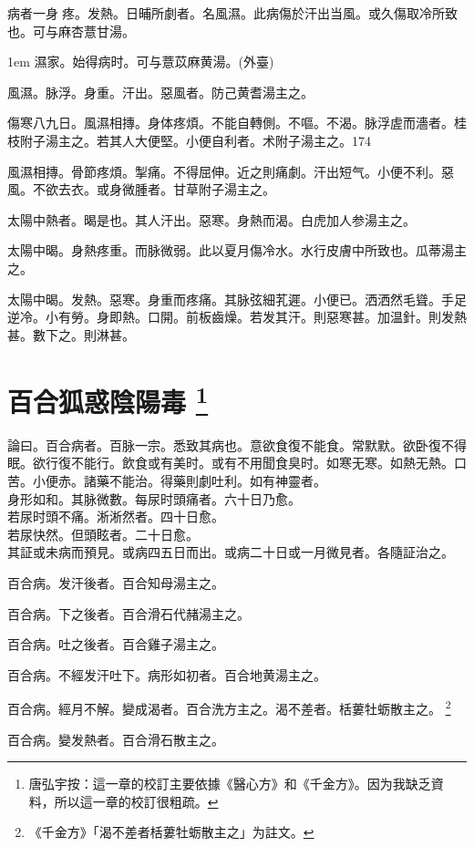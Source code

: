 病者一身{\sungtpii 𥁞}疼。发熱。日晡所劇者。名風濕。此病傷於汗出当風。或久傷取冷所致也。可与麻杏薏甘湯。

\hangindent 1em
濕家。始得病时。可与薏苡麻黄湯。(外臺)

風濕。脉浮。身重。汗出。惡風者。防己黄耆湯主之。

傷寒八九日。風濕相摶。身体疼煩。不能自轉側。不嘔。不渴。脉浮虗而濇者。桂枝附子湯主之。若其人大便堅。小便自利者。术附子湯主之。174

風濕相摶。骨節疼煩。掣痛。不得屈伸。近之則痛劇。汗出短气。小便不利。惡風。不欲去衣。或身微腫者。甘草附子湯主之。

太陽中熱者。暍是也。其人汗出。惡寒。身熱而渴。白虎{\khaaitp 加人参}湯主之。

太陽中暍。身熱疼重。而脉微弱。此以夏月傷冷水。水行皮膚中所致也。瓜蒂湯主之。

太陽中暍。发熱。惡寒。身重而疼痛。其脉弦細芤遲。小便已。洒洒然毛聳。手足逆冷。小有勞。身即熱。口開。前板齒燥。若发其汗。則惡寒甚。加温針。則发熱甚。數下之。則淋甚。

\chapter{百合狐惑陰陽毒
	{
		\footnote{
			唐弘宇按：這一章的校訂主要依據《醫心方》和《千金方》。因为我缺乏資料，所以這一章的校訂很粗疏。
		}
	}
}

論曰。百合病者。百脉一宗。悉致其病也。意欲食復不能食。常默默。欲卧{\khaaitp 復}不得眠。欲行{\khaaitp 復}不能行。飲食或有美时。或有不用聞食臭时。如寒无寒。如熱无熱。口苦。小便赤。諸藥不能治。得藥則劇吐利。如有神靈者。\\
身形如和。其脉微數。每尿时頭痛者。六十日乃愈。\\
若尿时頭不痛。淅{\khaaitp 淅}然者。四十日愈。\\
若尿快然。但頭眩者。二十日愈。\\
其証或未病而預見。或病四五日而出。或病二十日或一月微見者。各隨証治之。

百合病。发汗後者。百合知母湯主之。

百合病。下之後者。百合滑石代赭湯主之。

百合病。吐之後者。百合雞子湯主之。

百合病。不經发汗吐下。病形如初者。百合地黄湯主之。

百合病。經月不解。變成渴者。百合洗方主之。渴不差者。栝蔞牡蛎散主之。
	\footnote{
		《千金方》「渴不差者栝蔞牡蛎散主之」为註文。
	}

百合病。變发熱者。百合滑石散主之。

